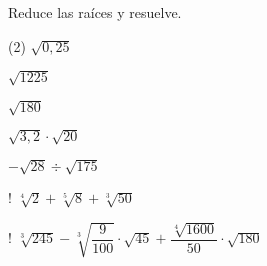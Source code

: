 \documentclass[]{srs}
\begin{document}
Reduce las raíces y resuelve.
\begin{preguntas}(2)
  \pregunta $\sqrt{0,25}$
  \begin{malla}[height=5cm]
  \end{malla}
  \pregunta $\sqrt{1225}$
  \begin{malla}[height=5cm]
  \end{malla}
  \pregunta $\sqrt{180}$
  \begin{malla}[height=5cm]
  \end{malla}
  \pregunta $\sqrt{3,2}\cdot\sqrt{20}$
  \begin{malla}[height=5cm]
  \end{malla}
  \pregunta $-\sqrt{28}\div\sqrt{175}$
  \begin{malla}[height=5cm]
  \end{malla}
  \pregunta! $\sqrt[4]{2}+\sqrt[5]{8}+\sqrt[3]{50}$
  \begin{malla}[height=5cm]
  \end{malla}
  \pregunta! $\sqrt[3]{245}-\sqrt[3]{\dfrac{9}{100}}\cdot\sqrt{45}+\dfrac{\sqrt[4]{1600}}{50}\cdot\sqrt{180}$
  \begin{malla}[height=7cm]
  \end{malla}
\end{preguntas}
\end{document}
